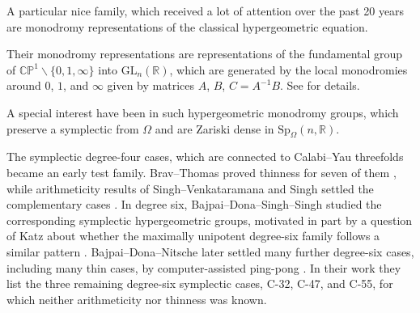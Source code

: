 \documentclass[11pt]{article}
\begin{document}
A particular nice family, which received a lot of attention over the past 20 years are monodromy representations of the classical hypergeometric equation.

Their monodromy representations are representations of the fundamental group of $\mathbb{C}\mathbb{P}^1 \backslash \{ 0, 1, \infty\}$ into $\mathrm{GL}_n(\mathbb{R})$, which are generated by the local monodromies around $0$, $1$, and $\infty$ given by matrices $A$, $B$, $C = A^{-1}B$. See 
\cite{Levelt1961HypergeometricFunctions,BeukersHeckman1989hypergeometric} for details. 

A special interest have been in such hypergeometric monodromy groups, which preserve a symplectic from $\Omega$ and are Zariski dense in $\mathrm{Sp}_{\Omega}(n,\mathbb{R})$.

The symplectic degree-four cases, which are connected to Calabi--Yau threefolds became
an early test family.  Brav--Thomas proved thinness for seven of them
\cite{BravThomas2014Thin}, while arithmeticity results of
Singh--Venkataramana and Singh settled the complementary cases
\cite{SinghVenkataramana2014Arithmeticity,Singh2015Four}.  In degree six,
Bajpai--Dona--Singh--Singh studied the corresponding symplectic
hypergeometric groups, motivated in part by a question of Katz about whether
the maximally unipotent degree-six family follows a similar pattern
\cite{BajpaiDonaSinghShashank2021degreesix}.  Bajpai--Dona--Nitsche later
settled many further degree-six cases, including many thin cases, by
computer-assisted ping-pong \cite{BajpaiDonaNitsche2025Thin}.  In their work \cite[Table 3]{BajpaiDonaNitsche2025Thin} they 
list the three remaining degree-six symplectic cases, C-32, C-47, and C-55, for
which neither arithmeticity nor thinness was known.
\end{document}
